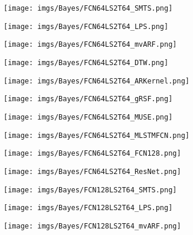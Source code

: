 \documentclass{article} \usepackage{iclr2021_conference,times}
\theoremstyle{plain}
\theoremstyle{definition}
\begin{document}
\begin{figure}
\begin{minipage}{0.245\textwidth}
		\centering
\texttt{[image: imgs/Bayes/FCN64LS2T64\_SMTS.png]}
\end{minipage}
	\begin{minipage}{0.245\textwidth}
		\centering
\texttt{[image: imgs/Bayes/FCN64LS2T64\_LPS.png]}
\end{minipage}
	\begin{minipage}{0.245\textwidth}
		\centering
\texttt{[image: imgs/Bayes/FCN64LS2T64\_mvARF.png]}
\end{minipage}
	\begin{minipage}{0.245\textwidth}
		\centering
\texttt{[image: imgs/Bayes/FCN64LS2T64\_DTW.png]}
\end{minipage}
\begin{minipage}{0.245\textwidth}
		\centering
\texttt{[image: imgs/Bayes/FCN64LS2T64\_ARKernel.png]}
\end{minipage}
	\begin{minipage}{0.245\textwidth}
		\centering
\texttt{[image: imgs/Bayes/FCN64LS2T64\_gRSF.png]}
\end{minipage}
\begin{minipage}{0.245\textwidth}
		\centering
\texttt{[image: imgs/Bayes/FCN64LS2T64\_MUSE.png]}
\end{minipage}
\begin{minipage}{0.245\textwidth}
		\centering
\texttt{[image: imgs/Bayes/FCN64LS2T64\_MLSTMFCN.png]}
\end{minipage}
	\begin{minipage}{0.245\textwidth}
		\centering
\texttt{[image: imgs/Bayes/FCN64LS2T64\_FCN128.png]}
\end{minipage}
	\begin{minipage}{0.245\textwidth}
		\centering
\texttt{[image: imgs/Bayes/FCN64LS2T64\_ResNet.png]}
\end{minipage}
	\begin{minipage}{0.245\textwidth}
		\centering
\texttt{[image: imgs/Bayes/FCN128LS2T64\_SMTS.png]}
\end{minipage}
	\begin{minipage}{0.245\textwidth}
		\centering
\texttt{[image: imgs/Bayes/FCN128LS2T64\_LPS.png]}
\end{minipage}
	\begin{minipage}{0.245\textwidth}
		\centering
\texttt{[image: imgs/Bayes/FCN128LS2T64\_mvARF.png]}
\end{minipage}

\end{figure}
\end{document}
